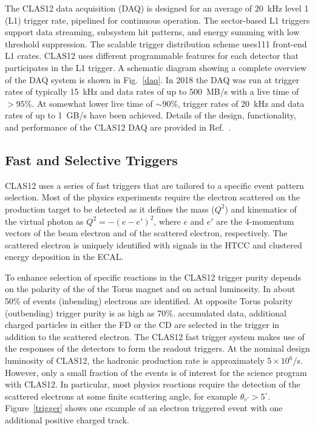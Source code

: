 \documentclass[final,3p,twocolumn]{elsarticle}
\begin{document}
The CLAS12 data acquisition (DAQ) is designed for an average of 20~kHz level 1 (L1) trigger rate, pipelined for
continuous operation. The sector-based  L1 triggers support data streaming, subsystem hit patterns, and energy
summing with low threshold suppression.  The scalable trigger distribution scheme uses111 front-end L1
crates. CLAS12 uses different programmable features for each detector that participates in the L1 trigger. A
schematic diagram showing a complete overview of the DAQ system is shown in Fig.~\ref{daq}. In 2018 the DAQ
was run at trigger rates of typically 15~kHz and data rates of up to 500~MB/s with a live time of $> 95\%$. At
somewhat lower live time of $\sim$90\%, trigger rates of 20~kHz and data rates of up to 1~GB/s have been
achieved. Details of the design, functionality, and performance of the CLAS12 DAQ are provided in Ref.~\cite{DAQ}. 
 


\subsection{Fast and Selective Triggers} 

CLAS12 uses a series of fast triggers that are tailored to a specific event pattern selection. Most of the physics
experiments require the electron scattered on the production target to be detected as it defines the mass
($Q^2$) and kinematics of the virtual photon as $Q^2 = -(e - e')^2$, where $e$ and $e'$ are the 4-momentum
vectors of the beam electron and of the scattered electron, respectively. The scattered electron is uniquely identified with
signals in the HTCC and clustered energy deposition in the ECAL. 

To enhance selection of specific reactions in the CLAS12 trigger purity depends on the polarity of the 
of the Torus magnet and on actual luminosity. In about 50\% of events (inbending) electrons are identified. At opposite
Torus polarity (outbending) trigger purity is as high as 70\%.
accumulated data, additional charged particles in either the FD or the CD are selected in the trigger in addition to
the scattered electron. The CLAS12 fast trigger system makes use of the responses of the detectors to form the
readout triggers. At the nominal design luminosity of CLAS12, the hadronic production rate is approximately
$5 \times 10^6$/s. However, only a small fraction of the events is of interest for the science program with
CLAS12. In particular, most physics reactions require the detection of the scattered electrons at some finite
scattering angle, for example $\theta_{e'} > 5^\circ$.  Figure~\ref{trigger} shows one example of an electron
triggered event with one additional positive charged track.   
   
\end{document}
